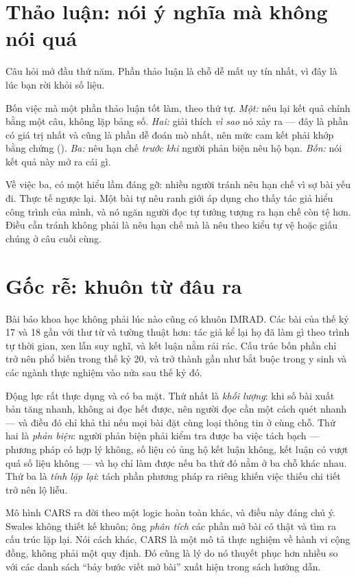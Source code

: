 \documentclass[../../english.tex]{subfiles}
\begin{document}
\section{Thảo luận: nói ý nghĩa mà không nói quá}

Câu hỏi mở đầu thứ năm. Phần thảo luận là chỗ dễ mất uy tín nhất, vì đây là lúc bạn rời khỏi số liệu.

Bốn việc mà một phần thảo luận tốt làm, theo thứ tự\cite{alley2018}. \emph{Một:} nêu lại kết quả chính bằng một câu, không lặp bảng số. \emph{Hai:} giải thích \emph{vì sao} nó xảy ra --- đây là phần có giá trị nhất và cũng là phần dễ đoán mò nhất, nên mức cam kết phải khớp bằng chứng (). \emph{Ba:} nêu hạn chế \emph{trước khi} người phản biện nêu hộ bạn. \emph{Bốn:} nói kết quả này mở ra cái gì.

Về việc ba, có một hiểu lầm đáng gỡ: nhiều người tránh nêu hạn chế vì sợ bài yếu đi. Thực tế ngược lại. Một bài tự nêu ranh giới áp dụng cho thấy tác giả hiểu công trình của mình, và nó ngăn người đọc tự tưởng tượng ra hạn chế còn tệ hơn. Điều cần tránh không phải là nêu hạn chế mà là nêu theo kiểu tự vệ hoặc giấu chúng ở câu cuối cùng.

\section{Gốc rễ: khuôn từ đâu ra}

Bài báo khoa học không phải lúc nào cũng có khuôn IMRAD. Các bài của thế kỷ 17 và 18 gần với thư từ và tường thuật hơn: tác giả kể lại họ đã làm gì theo trình tự thời gian, xen lẫn suy nghĩ, và kết luận nằm rải rác. Cấu trúc bốn phần chỉ trở nên phổ biến trong thế kỷ 20, và trở thành gần như bắt buộc trong y sinh và các ngành thực nghiệm vào nửa sau thế kỷ đó.

Động lực rất thực dụng và có ba mặt. Thứ nhất là \emph{khối lượng}: khi số bài xuất bản tăng nhanh, không ai đọc hết được, nên người đọc cần một cách quét nhanh --- và điều đó chỉ khả thi nếu mọi bài đặt cùng loại thông tin ở cùng chỗ. Thứ hai là \emph{phản biện}: người phản biện phải kiểm tra được ba việc tách bạch --- phương pháp có hợp lý không, số liệu có ủng hộ kết luận không, kết luận có vượt quá số liệu không --- và họ chỉ làm được nếu ba thứ đó nằm ở ba chỗ khác nhau. Thứ ba là \emph{tính lặp lại}: tách phần phương pháp ra riêng khiến việc thiếu chi tiết trở nên lộ liễu.

Mô hình CARS ra đời theo một logic hoàn toàn khác, và điều này đáng chú ý. Swales không thiết kế khuôn; ông \emph{phân tích} các phần mở bài có thật và tìm ra cấu trúc lặp lại. Nói cách khác, CARS là một mô tả thực nghiệm về hành vi cộng đồng, không phải một quy định. Đó cũng là lý do nó thuyết phục hơn nhiều so với các danh sách ``bảy bước viết mở bài'' xuất hiện trong sách hướng dẫn.
\end{document}
